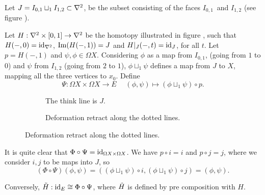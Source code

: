 \documentclass[a4paper,11pt,english]{article}
\begin{document}
\begin{exercise}[3]

Let $J = I_{0,1} \sqcup_1 I_{1,2} \subset \nabla^2$, be the subset consisting of
the faces $I_{0,1}$ and $I_{1,2}$ (see figure ).

Let $H: \nabla^2 \times [0,1] \to \nabla^2$ be the homotopy illustrated in figure
, such that $H(-,0) = \operatorname{id}_{\nabla^2}$, $\operatorname{Im}(H(-,1)) = J$ and
$H|_J(-,t) = \operatorname{id}_J$, for all $t$. Let $p = H(-,1)$ and $\psi, \phi \in \Omega
X$. Considering $\phi$ as a map from $I_{0,1}$, (going from $1$ to $0$) and
$\psi$ from $I_{1,2}$ (going from $2$ to $1$), $\phi \sqcup_1 \psi$ defines a
map from $J$ to $X$, mapping all the three vertices to $x_0$. Define 
\[ \Psi : \Omega X \times \Omega X \to E \; \quad (\phi, \psi) \mapsto
(\phi\sqcup_1 \psi) \circ p. \]

\begin{figure}[h]
\centering
\caption{}
\begin{subfigure}[b]{0.45\textwidth}
\centering

\caption{The think line is $J$.}
\label{fig:1a}
\end{subfigure}
\begin{subfigure}[b]{0.45\textwidth}
\centering

\caption{Deformation retract along the dotted lines.}
\label{fig:1b}
\end{subfigure}
\end{figure}

It is quite clear that $\Phi \circ \Psi = \operatorname{id}_{\Omega X \times \Omega X}$. We
have $p \circ i = i$ and $p \circ j = j$, where we consider $i,j$ to be maps
into $J$, so 
\[  (\Phi \circ \Psi)(\phi, \psi) = ( (\phi \sqcup_1 \psi) \circ i, (\phi
\sqcup_1 \psi) \circ j ) = (\phi, \psi). \]

Conversely, $\tilde H : \operatorname{id}_E \cong \Phi \circ \Psi$, where $\tilde H$ is defined
by pre composition with $H$.

\end{exercise}
\end{document}
